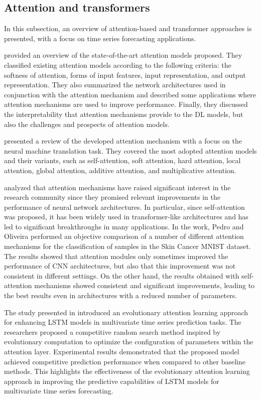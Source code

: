 \vspace{0.1 cm}
\subsection{Attention and transformers}
\label{sec:transformers}
\vspace{0.1 cm}

In this subsection, an overview of attention-based and transformer approaches is presented, with a focus on time series forecasting applications.

\cite{NIU202148} provided an overview of the state-of-the-art attention models proposed.
They classified existing attention models according to the following criteria: the softness of attention, forms of input features, input representation, and output representation.
They also summarized the network architectures used in conjunction with the attention mechanism and described some applications where attention mechanisms are used to improve performance.
Finally, they discussed the interpretability that attention mechanisms provide to the DL models, but also the challenges and prospects of attention models.

\cite{9586824} presented a review of the developed attention mechanism with a focus on the neural machine translation task.
They covered the most adopted attention models and their variants, such as self-attention, soft attention, hard attention, local attention, global attention, additive attention, and multiplicative attention.

\cite{9892274} analyzed that attention mechanisms have raised significant interest in the research community since they promised relevant improvements in the performance of neural network architectures.
In particular, since self-attention was proposed, it has been widely used in transformer-like architectures and has led to significant breakthroughs in many applications.
In the work, Pedro and Oliveira performed an objective comparison of a number of different attention mechanisms for the classification of samples in the Skin Cancer MNIST dataset.
The results showed that attention modules only sometimes improved the performance of CNN architectures, but also that this improvement was not consistent in different settings.
On the other hand, the results obtained with self-attention mechanisms showed consistent and significant improvements, leading to the best results even in architectures with a reduced number of parameters.

The study presented in \cite{LI2019104785} introduced an evolutionary attention learning approach for enhancing LSTM models in multivariate time series prediction tasks.
The researchers proposed a competitive random search method inspired by evolutionary computation to optimize the configuration of parameters within the attention layer.
Experimental results demonstrated that the proposed model achieved competitive prediction performance when compared to other baseline methods.
This highlights the effectiveness of the evolutionary attention learning approach in improving the predictive capabilities of LSTM models for multivariate time series forecasting.

